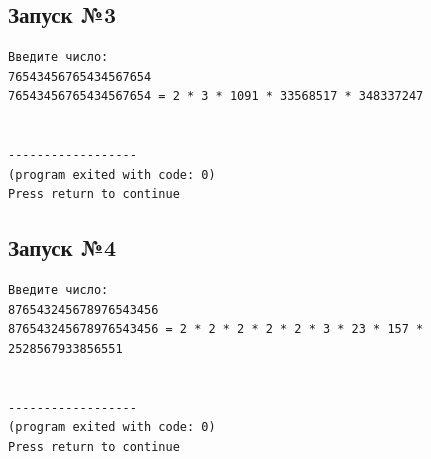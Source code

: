 \documentclass[a4paper,12pt]{article} %
\begin{document}
\subsection*{Запуск №3}
\begin{verbatim}
Введите число:
76543456765434567654
76543456765434567654 = 2 * 3 * 1091 * 33568517 * 348337247


------------------
(program exited with code: 0)
Press return to continue
\end{verbatim}

\subsection*{Запуск №4}
\begin{verbatim}
Введите число:
876543245678976543456
876543245678976543456 = 2 * 2 * 2 * 2 * 2 * 3 * 23 * 157 * 2528567933856551


------------------
(program exited with code: 0)
Press return to continue
\end{verbatim}


\printbibliography
\end{document}
